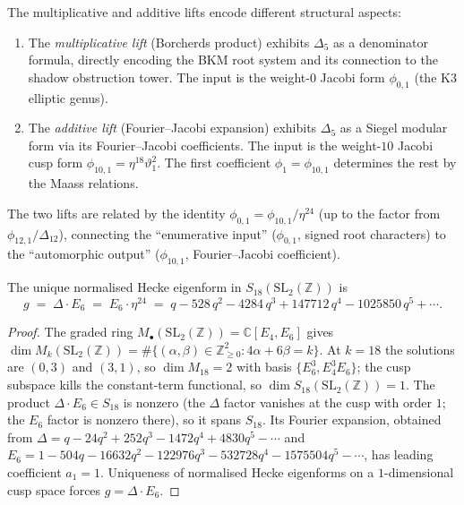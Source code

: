 \begin{remark}
\label{rem:k3e-two-lifts}
The multiplicative and additive lifts encode different structural aspects:
\begin{enumerate}[label=(\roman*)]
 \item The \emph{multiplicative lift} (Borcherds product) exhibits $\Delta_5$ as a denominator formula, directly encoding the BKM root system and its connection to the shadow obstruction tower. The input is the weight-$0$ Jacobi form $\phi_{0,1}$ (the K3 elliptic genus).
 \item The \emph{additive lift} (Fourier--Jacobi expansion) exhibits $\Delta_5$ as a Siegel modular form via its Fourier--Jacobi coefficients. The input is the weight-$10$ Jacobi cusp form $\phi_{10,1} = \eta^{18} \vartheta_1^2$. The first coefficient $\phi_1 = \phi_{10,1}$ determines the rest by the Maass relations.
\end{enumerate}
The two lifts are related by the identity $\phi_{0,1} = \phi_{10,1} / \eta^{24}$ (up to the factor from $\phi_{12,1} / \Delta_{12}$), connecting the ``enumerative input'' ($\phi_{0,1}$, signed root characters) to the ``automorphic output'' ($\phi_{10,1}$, Fourier--Jacobi coefficient).
\end{remark}

\begin{lemma}
\label{lem:k3e-elliptic-source-g-delta-E6}
The unique normalised Hecke eigenform in $S_{18}(\mathrm{SL}_2(\mathbb{Z}))$ is
\[
 g \;=\; \Delta \cdot E_6 \;=\; E_6 \cdot \eta^{24} \;=\; q - 528\,q^2 - 4284\,q^3 + 147712\,q^4 - 1025850\,q^5 + \cdots.
\]
\end{lemma}

\begin{proof}
The graded ring $M_\bullet(\mathrm{SL}_2(\mathbb{Z})) = \mathbb{C}[E_4, E_6]$ gives $\dim M_k(\mathrm{SL}_2(\mathbb{Z})) = \#\{(\alpha, \beta) \in \mathbb{Z}_{\geq 0}^2 : 4\alpha + 6\beta = k\}$. At $k = 18$ the solutions are $(0, 3)$ and $(3, 1)$, so $\dim M_{18} = 2$ with basis $\{E_6^3, E_4^3 E_6\}$; the cusp subspace kills the constant-term functional, so $\dim S_{18}(\mathrm{SL}_2(\mathbb{Z})) = 1$. The product $\Delta \cdot E_6 \in S_{18}$ is nonzero (the $\Delta$ factor vanishes at the cusp with order $1$; the $E_6$ factor is nonzero there), so it spans $S_{18}$. Its Fourier expansion, obtained from $\Delta = q - 24 q^2 + 252 q^3 - 1472 q^4 + 4830 q^5 - \cdots$ and $E_6 = 1 - 504 q - 16632 q^2 - 122976 q^3 - 532728 q^4 - 1575504 q^5 - \cdots$, has leading coefficient $a_1 = 1$. Uniqueness of normalised Hecke eigenforms on a $1$-dimensional cusp space forces $g = \Delta \cdot E_6$.
\end{proof}

